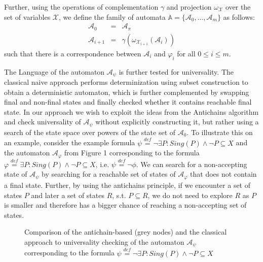\documentclass{eeict}
\begin{document}
Further, using the operations of complementation $\gamma$ and projection
$\omega_{\mathcal{X}}$ over the set of variables $\mathcal{X}$, we define the
family of automata $\mathds{A} = \{\mathcal{A}_0,\ldots,\mathcal{A}_m\}$ as follows:
\begin{eqnarray}
 \mathcal{A}_0 & = & \mathcal{A}_\pi\\
 \mathcal{A}_{i+1} & = & \gamma(\omega_{\mathcal{X}_{i+1}} (\mathcal{A}_i))
\end{eqnarray}
such that there is a correspondence between $\mathcal{A}_i$ and $\varphi_i$ for
all $0 \leq i \leq m$.

The Language of the automaton $\mathcal{A}_\psi$ is further tested for
universality.
The classical naive approach performs determinization using subset construction
to obtain a deterministic automaton, which is further complemented by
swapping final and non-final states and finally checked whether it contains
reachable final state. In our approach we wish to exploit the ideas from the
Antichains algorithm \cite{anti} and check universality of $\mathcal{A}_\psi$
without explicitly constructing it, but rather using a search of the state space
over powers of the state set of $\mathcal{A}_0$. To illustrate this on an
example, consider the example formula $\psi \overset{\mathit{def}}{=}
\neg\exists P:
 Sing(P) \wedge\neg P \subseteq X$ and the automaton
$\mathcal{A}_\varphi$ from Figure 1 corresponding to the formula $\varphi
\overset{\mathit{def}}{=} \exists P:
 Sing(P) \wedge\neg P \subseteq X$, i.e. $\psi \overset{\mathit{def}}{=} \neg
 \phi$. We can search for a non-accepting state of $\mathcal{A}_\psi$ by
 searching for a reachable set of states of $\mathcal{A}_\varphi$ that does not
 contain a final state. Further, by using the antichains principle, if we
 encounter a set of states $P$ and later a set of states $R$, s.t. $P \subseteq
 R$, we do not need to explore $R$ as $P$ is smaller and therefore has a bigger
 chance of reaching a non-accepting set of states.

\begin{figure}
 \begin{center}
 \end{center}
 \caption{Comparison of the antichain-based (grey nodes) and the classical
 approach to universality checking of the automaton $\mathcal{A}_\psi$
 corresponding to the formula $\psi \overset{\mathit{def}}{=} \neg\exists P:
 Sing(P) \wedge\neg P \subseteq X$}\label{compare}
\end{figure}
\end{document}
